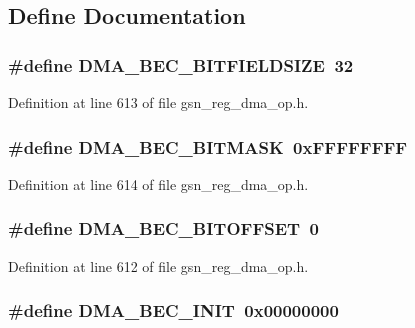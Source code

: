 \subsection{Define Documentation}
\hypertarget{a00547_a5ae1e4fd1ad40538223e030c5e7c4f70}{
\subsubsection[{DMA\_\-BEC\_\-BITFIELDSIZE}]{\setlength{\rightskip}{0pt plus 5cm}\#define DMA\_\-BEC\_\-BITFIELDSIZE~32}}
\label{a00547_a5ae1e4fd1ad40538223e030c5e7c4f70}


Definition at line 613 of file gsn\_\-reg\_\-dma\_\-op.h.

\hypertarget{a00547_a2becfaea83418cc2f99c46ebf387894f}{
\subsubsection[{DMA\_\-BEC\_\-BITMASK}]{\setlength{\rightskip}{0pt plus 5cm}\#define DMA\_\-BEC\_\-BITMASK~0xFFFFFFFF}}
\label{a00547_a2becfaea83418cc2f99c46ebf387894f}


Definition at line 614 of file gsn\_\-reg\_\-dma\_\-op.h.

\hypertarget{a00547_a57a67b1d0edc6422548771bdbc019af8}{
\subsubsection[{DMA\_\-BEC\_\-BITOFFSET}]{\setlength{\rightskip}{0pt plus 5cm}\#define DMA\_\-BEC\_\-BITOFFSET~0}}
\label{a00547_a57a67b1d0edc6422548771bdbc019af8}


Definition at line 612 of file gsn\_\-reg\_\-dma\_\-op.h.

\hypertarget{a00547_acf064bbaf030b22a8b1f9945eb74dfd0}{
\subsubsection[{DMA\_\-BEC\_\-INIT}]{\setlength{\rightskip}{0pt plus 5cm}\#define DMA\_\-BEC\_\-INIT~0x00000000}}
\label{a00547_acf064bbaf030b22a8b1f9945eb74dfd0}


